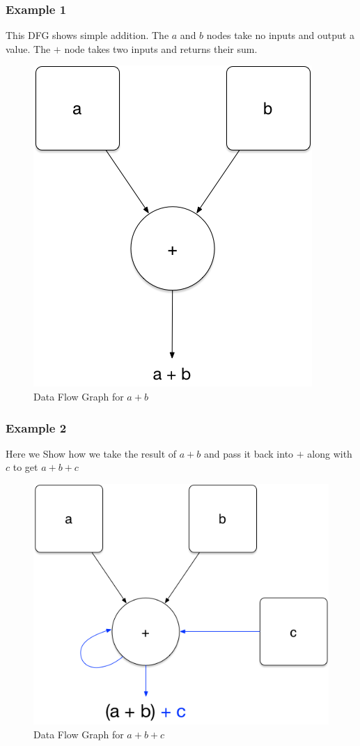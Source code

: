 \documentclass{beamer}
\begin{document}
\begin{frame}
  \frametitle{Example 1}

  This DFG shows simple addition.  The $a$ and $b$ nodes take no
  inputs and output a value.  The $+$ node takes two inputs and
  returns their sum.
  \begin{figure}
    \includegraphics[scale=0.3]{img/a_plus_b}
    \caption{Data Flow Graph for $a + b$}
  \end{figure}
\end{frame}

\begin{frame}
  \frametitle{Example 2}

  Here we Show how we take the result of $a + b$ and pass it back into
  $+$ along with $c$ to get $a + b + c$
  \begin{figure}
    \includegraphics[scale=0.3]{img/a_plus_b_plus_c}
    \caption{Data Flow Graph for $a + b + c$}
  \end{figure}
\end{frame}
\end{document}
